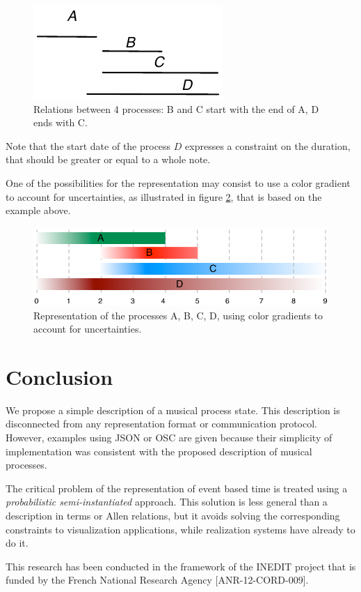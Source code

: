 \documentclass{article}
\begin{document}
\begin{figure}[h]
\begin{center}
	\includegraphics[width=0.5\columnwidth]{imgs/relation}
\caption{Relations between 4 processes: B and C start with the end of A, D ends with C.}
\label{fig:arel}
\end{center}
\end{figure}

Note that the start date of the process $D$ expresses a constraint on the duration, that should be greater or equal to a whole note.

One of the possibilities for the representation may consist to use a color gradient to account for uncertainties, as illustrated in figure \ref{fig:exvue}, that is based on the example above.

\begin{figure}[h]
\begin{center}
	\includegraphics[width=0.8\columnwidth]{imgs/exemplevue}
\caption{Representation of the processes A, B, C, D, using color gradients to account for uncertainties.}
\label{fig:exvue}
\end{center}
\end{figure}

\section{Conclusion}
We propose a simple description of a musical process state. This description is disconnected from any representation format or communication protocol. However, examples using JSON or OSC are given because their simplicity of implementation was consistent with the proposed description of musical processes.

The critical problem of the representation of event based time is treated using a \emph{probabilistic semi-instantiated} approach. This solution is less general than a description in terms or Allen relations, but it avoids solving the corresponding constraints to visualization applications, while realization systems have already to do it.

\begin{acknowledgments}
This research has been conducted in the framework of the INEDIT project that is funded by the French National Research Agency [ANR-12-CORD-009].
\end{acknowledgments} 

\balance

\end{document}
